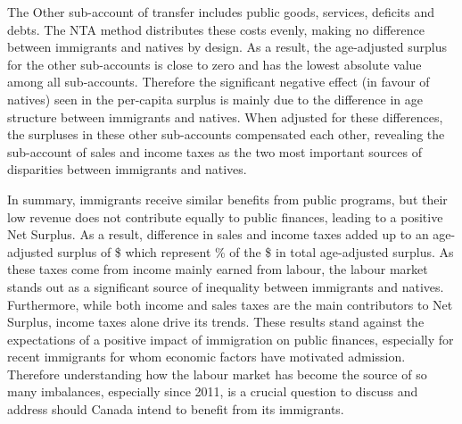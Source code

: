 \vspace{0.7em}\par
The Other sub-account of transfer includes public goods, services, deficits and debts.
The NTA method distributes these costs evenly, making no difference between immigrants and natives by design.
As a result, the age-adjusted surplus for the other sub-accounts is close to zero and has the lowest absolute value among all sub-accounts.
Therefore the significant negative effect (in favour of natives) seen in the per-capita surplus is mainly due to the difference in age structure between immigrants and natives.
When adjusted for these differences, the surpluses in these other sub-accounts compensated each other, revealing the sub-account of sales and income taxes as the two most important sources of disparities between immigrants and natives.

\vspace{0.7em}\par
In summary, immigrants receive similar benefits from public programs, but their low revenue does not contribute equally to public finances, leading to a positive Net Surplus.
As a result, difference in sales and income taxes added up to an age-adjusted surplus of \$ which represent \% of the \$ in total age-adjusted surplus.
As these taxes come from income mainly earned from labour, the labour market stands out as a significant source of inequality between immigrants and natives.
Furthermore, while both income and sales taxes are the main contributors to Net Surplus, income taxes alone drive its trends.
These results stand against the expectations of a positive impact of immigration on public finances, especially for recent immigrants for whom economic factors have motivated admission.
Therefore understanding how the labour market has become the source of so many imbalances, especially since 2011, is a crucial question to discuss and address should Canada intend to benefit from its immigrants.


















